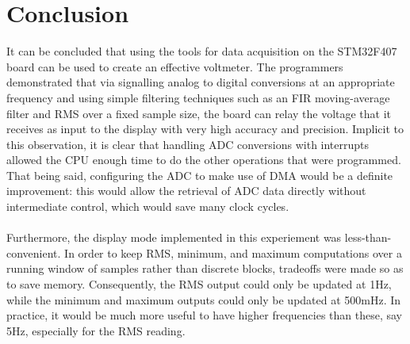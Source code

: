 \documentclass[12pt]{report}
\begin{document}
\section{Conclusion}
It can be concluded that using the tools for data acquisition on the STM32F407 board can be used to
create an effective voltmeter. The programmers demonstrated that via signalling analog to digital
conversions at an appropriate frequency and using simple filtering techniques such as an FIR
moving-average filter and RMS over a fixed sample size, the board can relay the voltage that it
receives as input to the display with very high accuracy and precision. Implicit to this
observation, it is clear that handling ADC conversions with interrupts allowed the CPU enough time
to do the other operations that were programmed. That being said, configuring the ADC to make use of
DMA would be a definite improvement: this would allow the retrieval of ADC data directly without
intermediate control, which would save many clock cycles.\\\\
Furthermore, the display mode implemented in this experiement was less-than-convenient. In order to
keep RMS, minimum, and maximum computations over a running window of samples rather than discrete
blocks, tradeoffs were made so as to save memory. Consequently, the RMS output could only be updated
at 1Hz, while the minimum and maximum outputs could only be updated at 500mHz. In practice, it would
be much more useful to have higher frequencies than these, say 5Hz, especially for the RMS
reading.\\\\
\newpage
\end{document}
